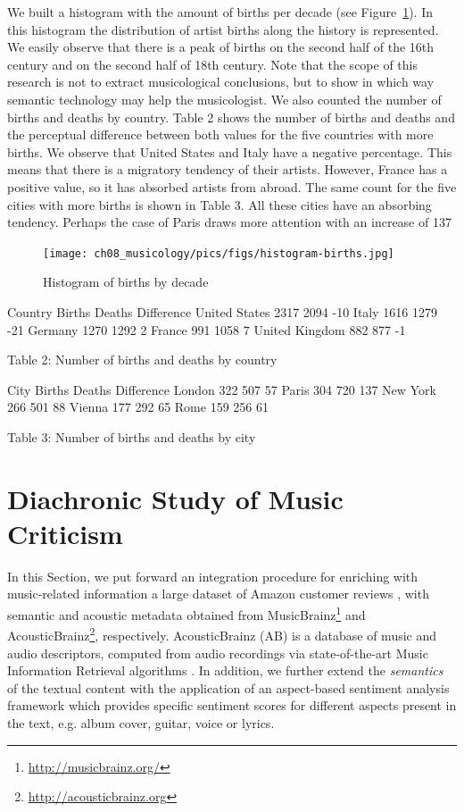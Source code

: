 We built a histogram with the amount of births per decade (see Figure~\ref{fig:hist-births}). In this histogram the distribution of artist births along the history is represented. We easily observe that there is a peak of births on the second half of the 16th century and on the second half of 18th century. Note that the scope of this research is not to extract musicological conclusions, but to show in which way semantic technology may help the musicologist. 
We also counted the number of births and deaths by country. Table 2 shows the number of births and deaths and the perceptual difference between both values for the five countries with more births. We observe that United States and Italy have a negative percentage. This means that there is a migratory tendency of their artists. However, France has a positive value, so it has absorbed artists from abroad. The same count for the five cities with more births is shown in Table 3. All these cities have an absorbing tendency. Perhaps the case of Paris draws more attention with an increase of 137%

\begin{figure}[!ht]
	\centering
	\texttt{[image: ch08\_musicology/pics/figs/histogram-births.jpg]}
	\caption{Histogram of births by decade
	\label{fig:hist-births}}
\end{figure}

Country	Births	Deaths	Difference
United States	2317	2094	-10%
Italy	1616	1279	-21%
Germany	1270	1292	2%
France	991	1058	7%
United Kingdom	882	877	-1%

Table 2: Number of births and deaths by country


City	Births	Deaths	Difference
London	322	507	57%
Paris	304	720	137%
New York	266	501	88%
Vienna	177	292	65%
Rome	159	256	61%

Table 3: Number of births and deaths by city



\section{Diachronic Study of Music Criticism}\label{sec:evolution}

In this Section, we put forward an integration procedure for enriching with music-related information a large dataset of Amazon customer reviews \cite{McAuley2015a,McAuley2015}, with semantic and acoustic metadata obtained from MusicBrainz\footnote{\url{http://musicbrainz.org/}} and AcousticBrainz\footnote{\url{http://acousticbrainz.org}}, respectively. AcousticBrainz (AB) is a database of music and audio descriptors, computed from audio recordings via state-of-the-art Music Information Retrieval algorithms \cite{Porter2015}.
In addition, we further extend the \textit{semantics} of the textual content with the application of an aspect-based sentiment analysis framework \cite{DongSOS13} which provides specific sentiment scores for different aspects present in the text, e.g. album cover, guitar, voice or lyrics.

